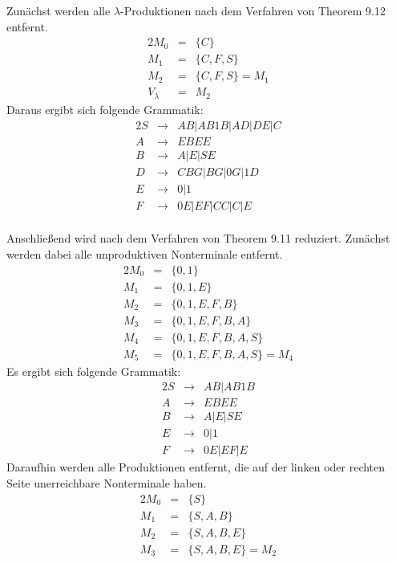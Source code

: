 \documentclass[10pt,a4paper,oneside,ngerman,numbers=noenddot]{scrartcl}
\begin{document}
\section{} %
Zunächst werden alle $\lambda$-Produktionen nach dem Verfahren von Theorem 9.12 entfernt.
\begin{alignat*}{2}
M_{0} &=& \{C\} \\
M_{1} &=& \{C,F,S\} \\
M_{2} &=& \{C,F,S\} = M_{1} \\
V_{\lambda} &=& M_{2}
\end{alignat*}
Daraus ergibt sich folgende Grammatik:\\
\begin{alignat*}{2}
S &\rightarrow & AB | AB1B | AD | DE | C \\
A &\rightarrow & EBEE \\
B &\rightarrow & A | E | SE \\
D &\rightarrow & CBG | BG | 0G | 1D \\
E &\rightarrow & 0 | 1 \\
F &\rightarrow & 0E | EF | CC | C | E
\end{alignat*}\\
Anschließend wird nach dem Verfahren von Theorem 9.11 reduziert. Zunächst werden dabei alle unproduktiven Nonterminale entfernt.\\
\begin{alignat*}{2}
M_{0} &=& \{0,1\} \\
M_{1} &=& \{0,1,E\} \\
M_{2} &=& \{0,1,E,F,B\} \\
M_{3} &=& \{0,1,E,F,B,A\} \\
M_{4} &=& \{0,1,E,F,B,A,S\} \\
M_{5} &=& \{0,1,E,F,B,A,S\} = M_{4}
\end{alignat*}
Es ergibt sich folgende Grammatik:\\
\begin{alignat*}{2}
S &\rightarrow & AB | AB1B \\
A &\rightarrow & EBEE \\
B &\rightarrow & A | E | SE \\
E &\rightarrow & 0 | 1 \\
F &\rightarrow & 0E | EF | E
\end{alignat*}
Daraufhin werden alle Produktionen entfernt, die auf der linken oder rechten Seite unerreichbare Nonterminale haben.
\begin{alignat*}{2}
M_{0} &=& \{S\} \\
M_{1} &=& \{S,A,B\} \\
M_{2} &=& \{S,A,B,E\} \\
M_{3} &=& \{S,A,B,E\} = M_{2}
\end{alignat*}
\end{document}
